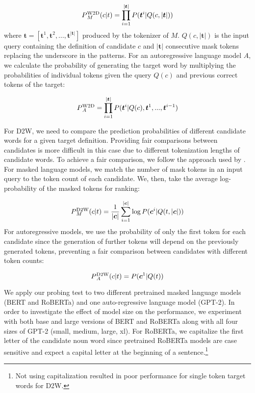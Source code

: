 \documentclass[11pt,a4paper]{article}
\def\uprm#1#2{\mbox{$_#2^{\hbox{\scriptsize #1}}$}}
\begin{document}
\begin{equation*}
  P\uprm{W2D}{M} (c|t) = \prod_{i=1}^{|\bm{t}|}P(\bm{t}^i|Q(c,|\bm{t}|))
\end{equation*}
where $\bm{t} = [\bm{t}^1, \bm{t}^2,...,\bm{t}^{|\bm{t}|}]$ produced by the tokenizer of $M$. $Q(c,|\bm{t}|)$ is the input query containing the definition of candidate $c$ and $|\bm{t}|$ consecutive mask tokens replacing the underscore in the patterns. For an autoregressive language model $A$, we calculate the probability of generating the target word by multiplying the probabilities of individual tokens given the query $Q(c)$ and previous correct tokens of the target:

\begin{equation*}
    P\uprm{W2D}{A} = \prod_{i=1}^{|\bm{t}|}P(\bm{t}^i|Q(c),\bm{t}^{1},...,\bm{t}^{i-1})
\end{equation*}

For D2W, we need to compare the prediction probabilities of
different candidate words for a given target
definition. Providing fair comparisons between candidates is
more difficult in this case due to different tokenization
lengths of candidate words. To achieve a fair comparison, we
follow the approach used by . For masked language models, we match the number of mask tokens in an input query to the token count of each candidate. We, then, take the average log-probability of the masked tokens for ranking:

\begin{equation*}
    P\uprm{D2W}{M}(c|t) =
    \frac{1}{|\bm{c}|}\sum_{i=1}^{|\bm{c}|}\log P(\bm{c}^i |
    Q(t,|\bm{c}|))
\end{equation*}
For autoregressive models, we use the probability of only the first token for each candidate since the generation of further tokens will depend on the previously generated tokens, preventing a fair comparison between candidates with different token counts:

\begin{equation*}
    P\uprm{D2W}{A}(c|t) =
     P(\bm{c}^1 |
    Q(t))
\end{equation*}

We apply our probing test to two different pretrained
masked language models (BERT and
RoBERTa) and one auto-regressive language model
(GPT-2). 
In order to investigate the effect of model
size on the performance, we experiment with both
base and large versions of BERT and RoBERTa
along with all four sizes of GPT-2 (small, medium,
large, xl). 
For RoBERTa, we capitalize the first letter of the candidate
noun word since pretrained RoBERTa models are case sensitive
and expect a capital letter at the beginning of a
sentence.\footnote{Not using capitalization  resulted in
  poor performance for single token target words for D2W.}
\end{document}
